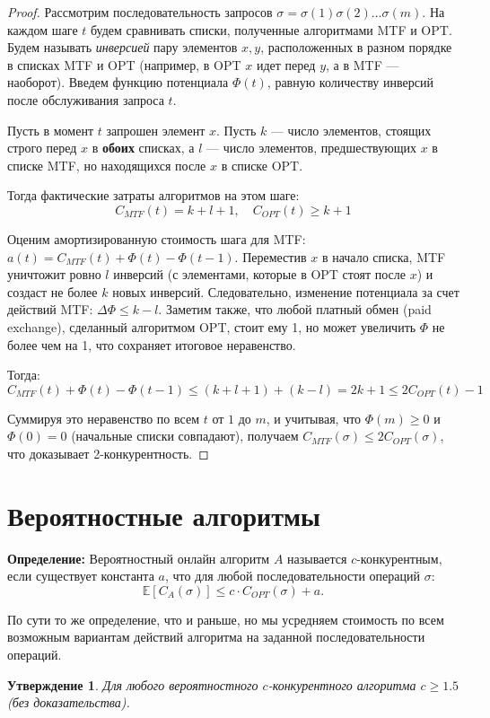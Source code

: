 \documentclass[12pt, a4paper]{article}
\newtheorem{proposition}{Утверждение}
\begin{document}
\begin{proof}
Рассмотрим последовательность запросов $\sigma = \sigma(1)\sigma(2)\dots\sigma(m)$. На каждом шаге $t$ будем сравнивать списки, полученные алгоритмами MTF и OPT. 
Будем называть \textit{инверсией} пару элементов $x, y$, расположенных в разном порядке в списках MTF и OPT (например, в OPT $x$ идет перед $y$, а в MTF --- наоборот).
Введем функцию потенциала $\Phi(t)$, равную количеству инверсий после обслуживания запроса $t$.

Пусть в момент $t$ запрошен элемент $x$. Пусть $k$ --- число элементов, стоящих строго перед $x$ в \textbf{обоих} списках, а $l$ --- число элементов, предшествующих $x$ в списке MTF, но находящихся после $x$ в списке OPT. 

Тогда фактические затраты алгоритмов на этом шаге:
$$C_{MTF}(t) = k + l + 1, \quad C_{OPT}(t) \ge k + 1$$

Оценим амортизированную стоимость шага для MTF: $a(t) = C_{MTF}(t) + \Phi(t) - \Phi(t-1)$.
Переместив $x$ в начало списка, MTF уничтожит ровно $l$ инверсий (с элементами, которые в OPT стоят после $x$) и создаст не более $k$ новых инверсий. Следовательно, изменение потенциала за счет действий MTF: $\Delta\Phi \le k - l$. 
Заметим также, что любой платный обмен (paid exchange), сделанный алгоритмом OPT, стоит ему 1, но может увеличить $\Phi$ не более чем на 1, что сохраняет итоговое неравенство.

Тогда:
$$C_{MTF}(t) + \Phi(t) - \Phi(t - 1) \le (k + l + 1) + (k - l) = 2k + 1 \le 2C_{OPT}(t) - 1$$

Суммируя это неравенство по всем $t$ от $1$ до $m$, и учитывая, что $\Phi(m) \ge 0$ и $\Phi(0) = 0$ (начальные списки совпадают), получаем $C_{MTF}(\sigma) \le 2C_{OPT}(\sigma)$, что доказывает 2-конкурентность.
\end{proof}

\section{Вероятностные алгоритмы}
\textbf{Определение:} Вероятностный онлайн алгоритм $A$ называется $c$-конкурентным, если существует константа $a$, что для любой последовательности операций $\sigma$:
$$\mathbb{E}[C_{A}(\sigma)] \le c \cdot C_{OPT}(\sigma) + a.$$

По сути то же определение, что и раньше, но мы усредняем стоимость по всем возможным вариантам действий алгоритма на заданной последовательности операций.

\begin{proposition}
Для любого вероятностного $c$-конкурентного алгоритма $c \geq 1.5$ (без доказательства).
\end{proposition}
\end{document}
